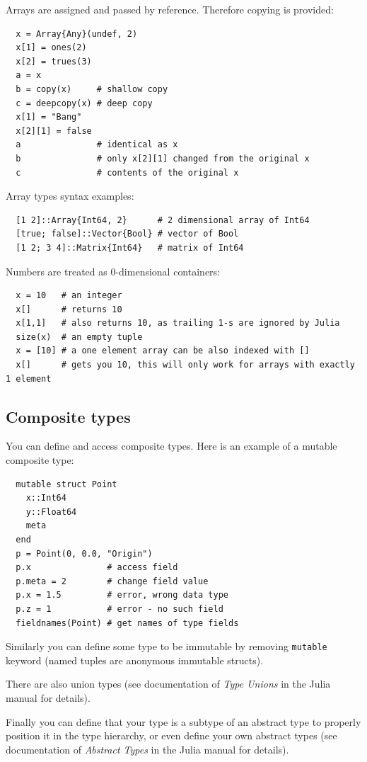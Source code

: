 \documentclass[10pt,a4paper]{article}
\begin{document}
Arrays are assigned and passed by reference. Therefore copying is provided:
\begin{lstlisting}
  x = Array{Any}(undef, 2)
  x[1] = ones(2)
  x[2] = trues(3)
  a = x
  b = copy(x)     # shallow copy
  c = deepcopy(x) # deep copy
  x[1] = "Bang"
  x[2][1] = false
  a               # identical as x
  b               # only x[2][1] changed from the original x
  c               # contents of the original x
\end{lstlisting}

Array types syntax examples:
\begin{lstlisting}
  [1 2]::Array{Int64, 2}      # 2 dimensional array of Int64
  [true; false]::Vector{Bool} # vector of Bool
  [1 2; 3 4]::Matrix{Int64}   # matrix of Int64
\end{lstlisting}

Numbers are treated as 0-dimensional containers:
\begin{lstlisting}
  x = 10   # an integer
  x[]      # returns 10
  x[1,1]   # also returns 10, as trailing 1-s are ignored by Julia
  size(x)  # an empty tuple
  x = [10] # a one element array can be also indexed with []
  x[]      # gets you 10, this will only work for arrays with exactly 1 element
\end{lstlisting}

\subsection{Composite types}
You can define and access composite types. Here is an example of a mutable composite type:
\begin{lstlisting}
  mutable struct Point
    x::Int64
    y::Float64
    meta
  end
  p = Point(0, 0.0, "Origin")
  p.x               # access field
  p.meta = 2        # change field value
  p.x = 1.5         # error, wrong data type
  p.z = 1           # error - no such field
  fieldnames(Point) # get names of type fields
\end{lstlisting}

Similarly you can define some type to be immutable by removing \lstinline|mutable| keyword (named tuples are anonymous immutable structs).

There are also union types (see documentation of \emph{Type Unions} in the Julia manual for details).

Finally you can define that your type is a subtype of an abstract type to properly position it in the type hierarchy, or even define your own abstract types (see documentation of \emph{Abstract Types} in the Julia manual for details).
\end{document}
